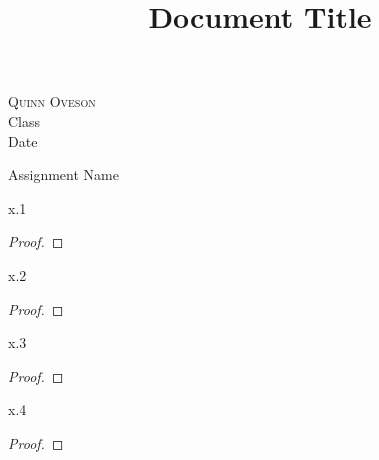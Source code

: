 %

\title{Document Title}

\begin{flushright}
\textsc{Quinn Oveson}  \\
Class\\
Date
\end{flushright}

\begin{center}
\textsf{Assignment Name} \\
\end{center}


\begin{exercise}{x.1}
\end{exercise}

\begin{proof}
\end{proof}


\begin{exercise}{x.2}
\end{exercise}

\begin{proof}
\end{proof}



\begin{exercise}{x.3}
\end{exercise}

\begin{proof}
\end{proof}


\begin{exercise}{x.4}
\end{exercise}

\begin{proof}
\end{proof}

